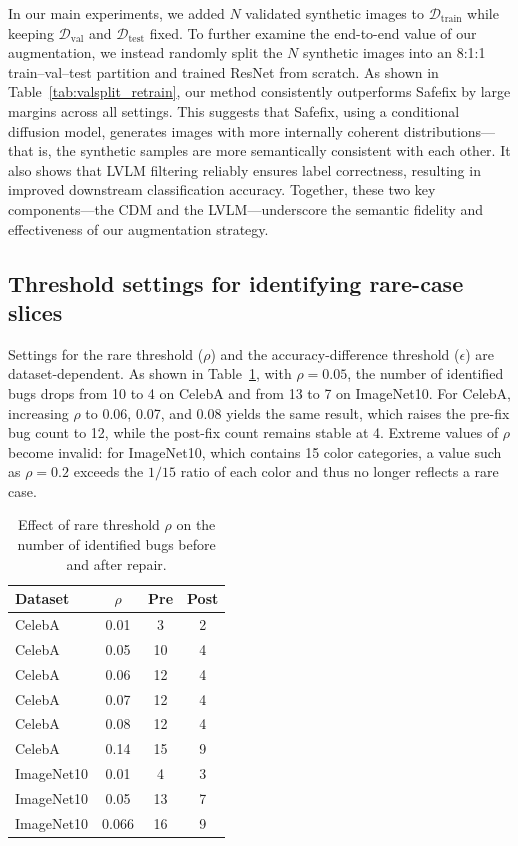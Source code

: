 \documentclass[10pt]{article} %
\newcommand{\model}{Safefix\xspace}
\newcommand{\hibug}{Safefix\xspace}
\begin{document}
In our main experiments, we added $N$ validated synthetic images to $\mathcal{D}_{\mathrm{train}}$ while keeping $\mathcal{D}_{\mathrm{val}}$ and $\mathcal{D}_{\mathrm{test}}$ fixed. To further examine the end-to-end value of our augmentation, we instead randomly split the $N$ synthetic images into an 8:1:1 train--val--test partition and trained ResNet from scratch. As shown in Table~\ref{tab:valsplit_retrain}, our method consistently outperforms \hibug{} by large margins across all settings. This suggests that \model, using a conditional diffusion model, generates images with more internally coherent distributions—that is, the synthetic samples are more semantically consistent with each other. It also shows that LVLM filtering reliably ensures label correctness, resulting in improved downstream classification accuracy. Together, these two key components—the CDM and the LVLM—underscore the semantic fidelity and effectiveness of our augmentation strategy.




\subsection{Threshold settings for identifying rare-case slices}
\label{sec:threshold}

Settings for the rare threshold ($\rho$) and the accuracy-difference threshold ($\epsilon$) are dataset-dependent. As shown in Table~\ref{tab:rho_threshold}, with $\rho=0.05$, the number of identified bugs drops from 10 to 4 on CelebA and from 13 to 7 on ImageNet10. For CelebA, increasing \(\rho\) to 0.06, 0.07, and 0.08 yields the same result, which raises the pre-fix bug count to 12, while the post-fix count remains stable at 4. Extreme values of $\rho$ become invalid: for ImageNet10, which contains 15 color categories, a value such as $\rho=0.2$ exceeds the $1/15$ ratio of each color and thus no longer reflects a rare case.

\begin{table}[!t]
\centering
\small
\setlength{\tabcolsep}{6pt}
\renewcommand{\arraystretch}{0.95}
\caption{Effect of rare threshold $\rho$ on the number of identified bugs before and after repair.}
\label{tab:rho_threshold}
\begin{tabular}{lccc}
\toprule
\textbf{Dataset} & \boldmath$\rho$ & \textbf{Pre} & \textbf{Post} \\
\midrule
CelebA      & 0.01        & 3  & 2 \\
CelebA      & 0.05        & 10 & 4 \\
CelebA      & 0.06  & 12 & 4 \\
CelebA      & 0.07  & 12 & 4 \\
CelebA      & 0.08  & 12 & 4 \\
CelebA      & 0.14        & 15 & 9 \\
ImageNet10  & 0.01        & 4  & 3 \\
ImageNet10  & 0.05        & 13 & 7 \\
ImageNet10  & 0.066       & 16 & 9 \\
\bottomrule
\end{tabular}
\end{table}
\end{document}
